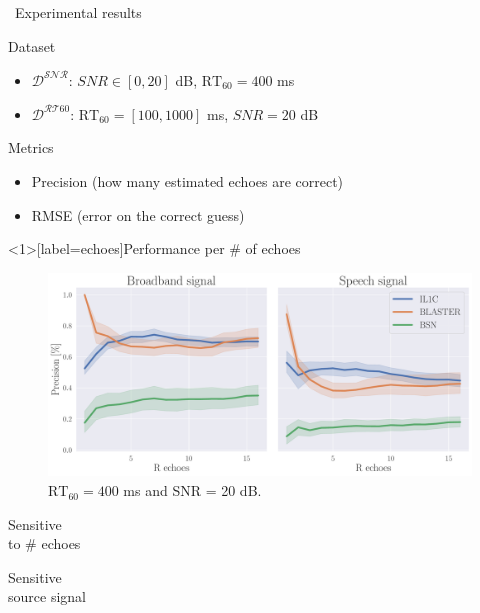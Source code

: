 \begin{frame}[t]{\faFlask~Experimental results \hfill\faJediOrder}
    \pause
    \begin{block}{Dataset}
        \begin{itemize}
            \footnotesize
            \item $\mathcal{D^{\text{SNR}}}$: $SNR \in [0, 20]$ dB, $\text{RT}_{60} = 400$ ms
            \item $\mathcal{D^{\text{RT60}}}$: $\text{RT}_{60} = [100, 1000]$ ms, $SNR = 20$ dB
        \end{itemize}
    \end{block}

    \pause
    \begin{block}{Metrics}
        \begin{itemize}
            \item Precision (how many estimated echoes are correct)
            \item RMSE (error on the correct guess)
        \end{itemize}
    \end{block}

\end{frame}


\begin{frame}<1>[label=echoes]{Performance per \# of echoes \hfill\faJediOrder}
    \begin{figure}[t!]
    \centering
        \includegraphics[width=\linewidth]{figures/p_k-7_thr-2_bns_crocco_blaster-peak_withRechoes.pdf}
        \caption{$\text{RT}_{60} = 400$ ms and SNR = 20 dB.}
    \end{figure}

    \begin{center}
        \textcolor{myred}{\xmark \: \parbox{8em}{Sensitive\\to \# echoes}}
        \textcolor{myred}{\xmark \: \parbox{8em}{Sensitive\\source signal}}
    \end{center}

\end{frame}

